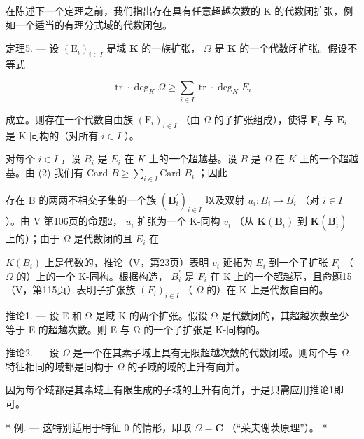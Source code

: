 在陈述下一个定理之前，我们指出存在具有任意超越次数的 K 的代数闭扩张，例如一个适当的有理分式域的代数闭包。

定理5. --- 设 \((\mathrm{E}_i)_{i\in I}\) 是域 \(\mathbf{K}\) 的一族扩张， \(\Omega\) 是 \(\mathbf{K}\) 的一个代数闭扩张。假设不等式

\[
\operatorname{tr} \cdot \deg_ {K} \Omega \geqslant \sum_ {i \in I} \operatorname{tr} \cdot \deg_ {K} E _ {i}\tag{2}
\]

成立。则存在一个代数自由族 \((\mathrm{F}_i)_{i\in I}\) （由 \(\Omega\) 的子扩张组成），使得 \(\mathbf{F}_i\) 与 \(\mathbf{E}_i\) 是 K-同构的（对所有 \(i\in I\) ）。

对每个 \(i \in I\) ，设 \(B_i\) 是 \(E_i\) 在 \(K\) 上的一个超越基。设 \(B\) 是 \(\Omega\) 在 \(K\) 上的一个超越基。由 (2) 我们有 Card \(B \geqslant \sum_{i \in I} \text{Card } B_i\) ；因此

存在 B 的两两不相交子集的一个族 \((\mathbf{B}_{i}^{\prime})_{i\in I}\) 以及双射 \(u_{i}:B_{i}\to B_{i}^{\prime}\) （对 \(i\in I\) ）。由 V 第106页的命题2， \(u_{i}\) 扩张为一个 K-同构 \(v_{i}\) （从 \(\mathbf{K}(\mathbf{B}_{i})\) 到 \(\mathbf{K}(\mathbf{B}_{i}^{\prime})\) 上的）；由于 \(\Omega\) 是代数闭的且 \(E_{i}\) 在

\(K(B_{i})\) 上是代数的，推论（V，第23页）表明 \(v_{i}\) 延拓为 \(E_{i}\) 到一个子扩张 \(F_{i}\) （ \(\Omega\) 的）上的一个 K-同构。根据构造， \(B_{i}^{\prime}\) 是 \(F_{i}\) 在 K 上的一个超越基，且命题15（V，第115页）表明子扩张族 \((F_{i})_{i\in I}\) （ \(\Omega\) 的）在 K 上是代数自由的。

推论1. --- 设 E 和 Ω 是域 K 的两个扩张。假设 Ω 是代数闭的，其超越次数至少等于 E 的超越次数。则 E 与 Ω 的一个子扩张是 K-同构的。

推论2. --- 设 \(\Omega\) 是一个在其素子域上具有无限超越次数的代数闭域。则每个与 \(\Omega\) 特征相同的域都是同构于 \(\Omega\) 的子域的域的上升有向并。

因为每个域都是其素域上有限生成的子域的上升有向并，于是只需应用推论1即可。

* 例. --- 这特别适用于特征 0 的情形，即取 \(\Omega = \mathbf{C}\) （“莱夫谢茨原理”）。 *

